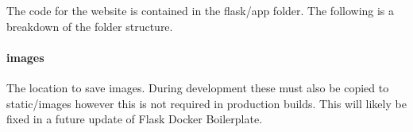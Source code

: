 The code for the website is contained in the flask/app folder.  The following is a breakdown of the folder structure.

\paragraph{images}  The location to save images.  During development these must also be copied to static/images however this is not required in production builds.  This will likely be fixed in a future update of Flask Docker Boilerplate.


